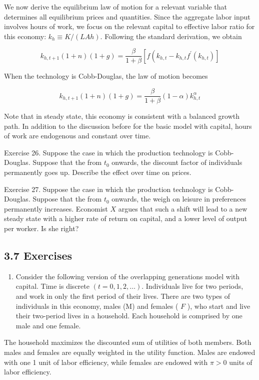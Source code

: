 \documentclass[10pt]{article}
\begin{document}
We now derive the equilibrium law of motion for a relevant variable that determines all equilibrium prices and quantities. Since the aggregate labor input involves hours of work, we focus on the relevant capital to effective labor ratio for this economy: $k_{h} \equiv K /(L A h)$. Following the standard derivation, we obtain

$$
k_{h, t+1}(1+n)(1+g)=\frac{\beta}{1+\beta}\left[f\left(k_{h, t}-k_{h, t} f^{\prime}\left(k_{h, t}\right)\right]\right.
$$

When the technology is Cobb-Douglas, the law of motion becomes

$$
k_{h, t+1}(1+n)(1+g)=\frac{\beta}{1+\beta}(1-\alpha) k_{h, t}^{\alpha}
$$

Note that in steady state, this economy is consistent with a balanced growth path. In addition to the discussion before for the basic model with capital, hours of work are endogenous and constant over time.

Exercise 26. Suppose the case in which the production technology is Cobb-Douglas. Suppose that the from $t_{0}$ onwards, the discount factor of individuals permanently goes up. Describe the effect over time on prices.

Exercise 27. Suppose the case in which the production technology is Cobb-Douglas. Suppose that the from $t_{0}$ onwards, the weigh on leisure in preferences permanently increases. Economist $X$ argues that such a shift will lead to a new steady state with a higher rate of return on capital, and a lower level of output per worker. Is she right?

\subsection*{3.7 Exercises}
\begin{enumerate}
  \item Consider the following version of the overlapping generations model with capital. Time is discrete $(t=0,1,2, \ldots)$. Individuals live for two periods, and work in only the first period of their lives. There are two types of individuals in this economy, males (M) and females ( $F$ ), who start and live their two-period lives in a household. Each household is comprised by one male and one female.
\end{enumerate}

The household maximizes the discounted sum of utilities of both members. Both males and females are equally weighted in the utility function. Males are endowed with one 1 unit of labor efficiency, while females are endowed with $\pi>0$ units of labor efficiency.
\end{document}
